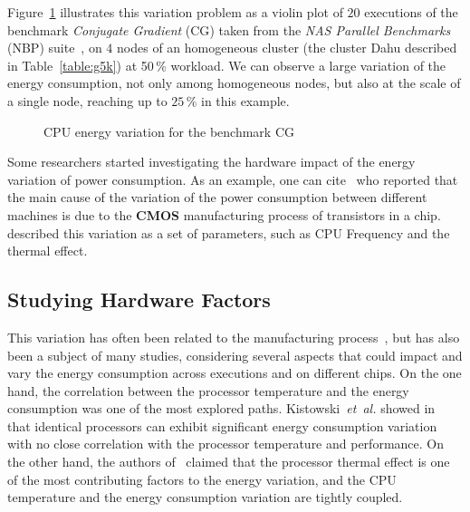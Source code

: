 Figure~\ref{fig:motivation} illustrates this variation problem as a violin plot of $20$ executions of the benchmark \emph{Conjugate Gradient} (\textsf{CG}) taken from the \emph{NAS Parallel Benchmarks} (NBP) suite~\cite{Bailey:1991:NPB:125826.125925}, on $4$ nodes of an homogeneous cluster (the cluster \textsf{Dahu} described in Table~\ref{table:g5k}) at 50\,\% workload.
We can observe a large variation of the energy consumption, not only among homogeneous nodes, but also at the scale of a single node, reaching up to $25\,\%$ in this example.

\begin{figure}%
    \caption{CPU energy variation for the benchmark \textsf{CG}}\label{fig:motivation}
\end{figure}
Some researchers started investigating the hardware impact of the energy variation of power consumption.
As an example, one can cite~\cite{borkar_designing_2005,tschanz_adaptive_2002} who reported that the main cause of the variation of the power consumption between different machines is due to the \textbf{CMOS} manufacturing process of transistors in a chip.
\cite{heinrich_predicting} described this variation as a set of parameters, such as CPU Frequency and the thermal effect.
\subsection{Studying Hardware Factors}
This variation has often been related to the manufacturing process~\cite{coles_comparing_2014}, but has also been a subject of many studies, considering several aspects that could impact and vary the energy consumption across executions and on different chips.
On the one hand, the correlation between the processor temperature and the energy consumption was one of the most explored paths.
Kistowski~\emph{et~al.} showed in~\cite{joakim_v_kisroski_variations_2016} that identical processors can exhibit significant energy consumption variation with no close correlation with the processor temperature and performance.
On the other hand, the authors of~\cite{wang_potential_2018} claimed that the processor thermal effect is one of the most contributing factors to the energy variation, and the CPU temperature and the energy consumption variation are tightly coupled.

